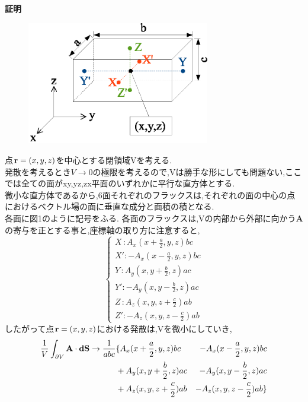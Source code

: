 \documentclass[../main]{subfiles}
\begin{document}
\newpage
{\bf 証明}\\

\begin{figure}[htbp]
 \begin{center}
  \includegraphics[width=80mm]{3.1.eps}
 \end{center}
 \caption{}
 \label{fig:one}
\end{figure}
点${\bf r}=(x,y,z)$を中心とする閉領域Vを考える.\\
発散を考えるとき$V \to 0$の極限を考えるので,Vは勝手な形にしても問題ない,ここでは全ての面がxy,yz,zx平面のいずれかに平行な直方体とする.\\
微小な直方体であるから,6面それぞれのフラックスは,それぞれの面の中心の点におけるベクトル場の面に垂直な成分と面積の積となる.\\
各面に図1のように記号をふる.
各面のフラックスは,Vの内部から外部に向かう{\bf A}の寄与を正とする事と,座標軸の取り方に注意すると,
\begin{equation}
\left \{
\begin{array}{l}
X\,: A_x(x+\frac{a}{2},y,z)bc\\
X': -A_x(x-\frac{a}{2},y,z)bc\\
Y\,: A_y(x,y+\frac{b}{2},z)ac\\
Y': -A_y(x,y-\frac{b}{2},z)ac\\
Z\,: A_z(x,y,z+\frac{c}{2})ab\\
Z': -A_z(x,y,z-\frac{c}{2})ab
\end{array}
\right.
\end{equation}
したがって点${\bf r}=(x,y,z)$における発散は,Vを微小にしていき,
\begin{eqnarray}
\frac{1}{V}\int_{\partial V}^{}{\bf A}\cdot {\bf dS} \to \frac{1}{abc} &\{A_x(x+\frac{a}{2},y,z)bc & -A_x(x-\frac{a}{2},y,z)bc \\
 &+A_y(x,y+\frac{b}{2},z)ac&-A_y(x,y-\frac{b}{2},z)ac \\
&+A_z(x,y,z+\frac{c}{2})ab&-A_z(x,y,z-\frac{c}{2})ab \}
\end{eqnarray}
\end{document}

